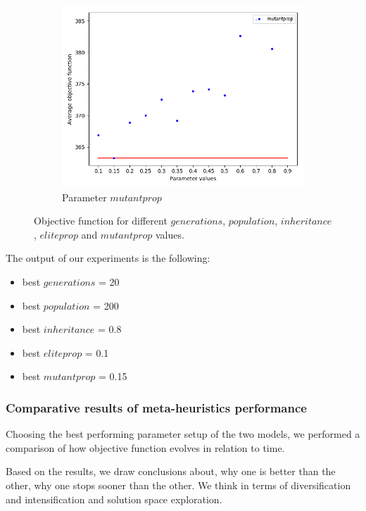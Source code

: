\begin{figure}
\begin{subfigure}[b]{.49\linewidth}
\includegraphics[width=\linewidth]{./img/best-mutantprop.png}
\caption{Parameter $mutantprop$ }\label{fig2e}
\end{subfigure}%
\caption{Objective function for different  $generations$,  $population$,  $inheritance$,  $eliteprop$ and  $mutantprop$ values.  }
\end{figure}


The output of our experiments is the following: 
\begin{itemize}
	\item best $generations$ = 20
	\item best $population$ = 200
	\item best $inheritance$ = 0.8
	\item best $eliteprop$ = 0.1
	\item best $mutantprop$ = 0.15
\end{itemize}

\subsubsection{Comparative results of meta-heuristics performance}

Choosing the best performing parameter setup of the two models, we performed a comparison of how objective function evolves in relation to time.

Based on the results, we draw conclusions about, why one is better than the other, why one stops sooner than the other. We think in terms of diversification and intensification and solution space exploration.\\

\pagebreak